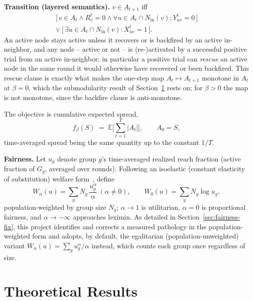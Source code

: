 \documentclass[journal]{IEEEtran}
\begin{document}
\textbf{Transition (layered semantics).} $v\in A_{t+1}$ iff
\begin{equation}
\begin{split}
\big[\,v\in A_t \wedge R^t_v=0 \wedge \forall u\in A_t\cap N_{\mathrm{in}}(v): Y^t_{uv}=0\,\big]\\
\vee\ \big[\,\exists u\in A_t\cap N_{\mathrm{in}}(v): X^t_{uv}=1\,\big].
\end{split}
\end{equation}
An active node stays active unless it recovers or is backfired by an active
in-neighbor, and any node -- active or not -- is (re-)activated by a
successful positive trial from an active in-neighbor; in particular a
positive trial can \emph{rescue} an active node in the same round it would
otherwise have recovered or been backfired. This rescue clause is exactly
what makes the one-step map $A_t\mapsto A_{t+1}$ monotone in $A_t$ at
$\beta=0$, which the submodularity result of Section~\ref{sec:theory}
rests on; for $\beta>0$ the map is not monotone, since the backfire clause
is anti-monotone.

The objective is cumulative expected spread,
\begin{equation}
f_\beta(S) \;=\; \mathbb{E}\Big[\sum_{t=1}^T |A_t|\Big], \qquad A_0=S,
\end{equation}
time-averaged spread being the same quantity up to the constant $1/T$.

\textbf{Fairness.} Let $u_g$ denote group $g$'s time-averaged realized reach
fraction (active fraction of $G_g$, averaged over rounds). Following an
isoelastic (constant elasticity of substitution) welfare
form~\cite{rahmattalabi2021fair}, define
\begin{equation}
W_\alpha(u) = \sum_g N_g\,\frac{u_g^\alpha}{\alpha}\ (\alpha\ne0), \qquad
W_0(u) = \sum_g N_g \log u_g,
\end{equation}
population-weighted by group size $N_g$; $\alpha\to1$ is utilitarian,
$\alpha=0$ is proportional fairness, and $\alpha\to-\infty$ approaches
leximin. As detailed in Section~\ref{sec:fairness-fix}, this project
identifies and corrects a measured pathology in the population-weighted
form and adopts, by default, the egalitarian (population-unweighted)
variant $W_\alpha(u)=\sum_g u_g^\alpha/\alpha$ instead, which counts each
group once regardless of size.

\section{Theoretical Results}
\label{sec:theory}
\end{document}
